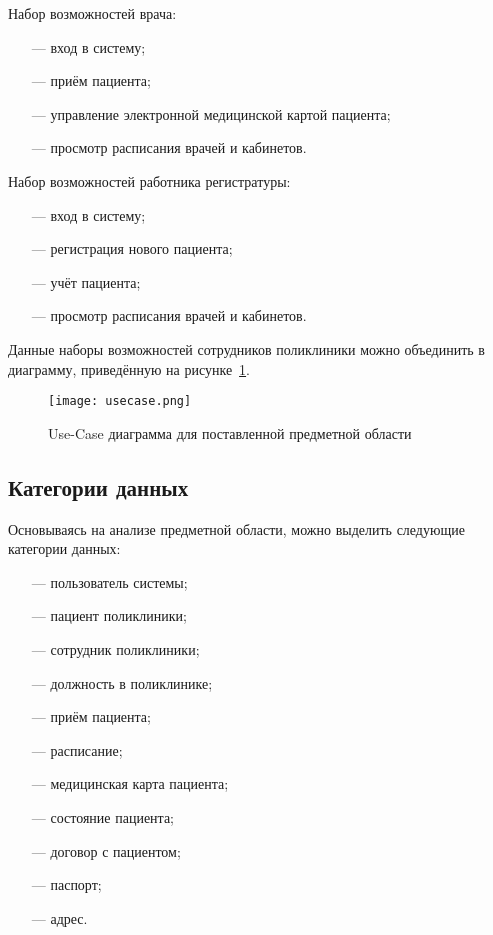 Набор возможностей врача:
\begin{itemize}[leftmargin=1.6\parindent]
	\item[---] вход в систему;
	\item[---] приём пациента;
	\item[---] управление электронной медицинской картой пациента;
	\item[---] просмотр расписания врачей и кабинетов.
\end{itemize}

Набор возможностей работника регистратуры:
\begin{itemize}[leftmargin=1.6\parindent]
	\item[---] вход в систему;
	\item[---] регистрация нового пациента;
	\item[---] учёт пациента;
	\item[---] просмотр расписания врачей и кабинетов.
\end{itemize}

Данные наборы возможностей сотрудников поликлиники можно объединить в диаграмму, приведённую на рисунке~\ref{fig:usecase}.

\begin{figure}[h!]
	\centering
	\captionsetup{justification=centering}
	\texttt{[image: usecase.png]}
	\caption{Use-Case диаграмма для поставленной предметной области}
	\label{fig:usecase}
\end{figure}


%

\subsection{Категории данных}

Основываясь на анализе предметной области, можно выделить следующие категории данных:
\begin{itemize}[leftmargin=1.6\parindent]
	\item[---] пользователь системы;
	\item[---] пациент поликлиники;
	\item[---] сотрудник поликлиники;
	\item[---] должность в поликлинике;
	\item[---] приём пациента;
	\item[---] расписание;
	\item[---] медицинская карта пациента;
	\item[---] состояние пациента;
	\item[---] договор с пациентом;
	\item[---] паспорт;
	\item[---] адрес.
\end{itemize}

